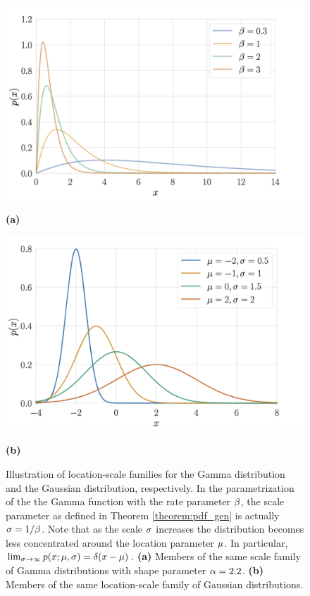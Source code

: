 \begin{figure}
\begin{center}
   \begin{minipage}[b]{0.49\linewidth}
      \includegraphics[width=\linewidth]{gamma_family}
		\caption*{\textbf{(a)}}
	\end{minipage}
	\begin{minipage}[b]{0.49\linewidth}
      \includegraphics[width=\linewidth]{gaussian_family}
		\caption*{\textbf{(b)}}
	\end{minipage}
	\caption{Illustration of location-scale families for the Gamma distribution and the Gaussian distribution, respectively. In the parametrization of the the Gamma function with the rate parameter $\beta$, the scale parameter as defined in Theorem \ref{theorem:pdf_gen} is actually $\operatorname{\sigma} = 1/\beta$. Note that as the scale $\operatorname{\sigma}$ increases the distribution becomes less concentrated around the location parameter $\operatorname{\mu}$. In particular, $\lim_{\operatorname{\sigma}\to\infty} p(x; \operatorname{\mu},\operatorname{\sigma}) = \delta(x-\operatorname{\mu})$. \textbf{(a)} Members of the same scale family of Gamma distributions with shape parameter $\alpha = 2.2$. \textbf{(b)} Members of the same location-scale family of Gaussian distributions.}\label{fig:pdf_gen}
\end{center}
\end{figure}


